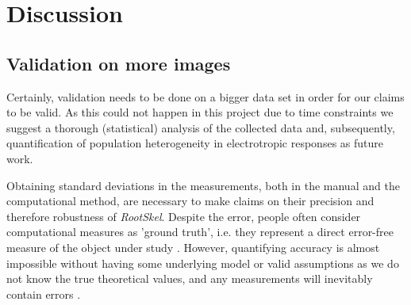 
\chapter{Discussion} %

\label{discussion} %

%





\section{Validation on more images}\label{sec:validation}



Certainly, validation needs to be done on a bigger data set in order for our claims to be valid.
As this could not happen in this project due to time constraints we suggest a thorough (statistical) analysis of the collected data and, subsequently, quantification of population heterogeneity in electrotropic responses as future work.

Obtaining standard deviations in the measurements, both in the manual and the computational method, are necessary to make claims on their precision and therefore robustness of \textit{RootSkel}. Despite the error, people often consider computational measures as 'ground truth', i.e. they represent a direct error-free measure of the object under study \cite{pound2017autoroot}. However, quantifying accuracy is almost impossible without having some underlying model or valid assumptions as we do not know the true theoretical values, and any measurements will inevitably contain errors %
\cite{dee2015image}.

